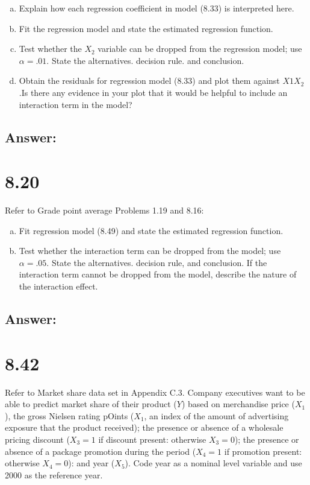 \documentclass{article}
\begin{document}
\begin{enumerate}[a)]
\item{} Explain how each regression coefficient in model (8.33) is interpreted here.
\item{} Fit the regression model and state the estimated regression function.
\item{} Test whether the $X_2$ variable can be dropped from the regression model; use $\alpha{} = .01$. State the alternatives. decision rule. and conclusion.
\item{} Obtain the residuals for regression model (8.33) and plot them against $X1X_2$.Is there any evidence in your plot that it would be helpful to include an interaction term in the model?
\end{enumerate}

\subsection{Answer:}

\section{8.20}

Refer to Grade point average Problems 1.19 and 8.16:

\begin{enumerate}[a)]
\item{} Fit regression model (8.49) and state the estimated regression function.
\item{} Test whether the interaction term can be dropped from the model; use $\alpha{} = .05$. State the alternatives. decision rule, and conclusion. If the interaction term cannot be dropped from the model, describe the nature of the interaction effect.
\end{enumerate}

\subsection{Answer:}

\section{8.42}

Refer to Market share data set in Appendix C.3. Company executives want to be able to predict market share of their product ($Y$) based on merchandise price ($X_1$), the gross Nielsen rating pOints ($X_1$, an index of the amount of advertising exposure that the product received); the presence or absence of a wholesale pricing discount ($X_3 = 1$ if discount present: otherwise $X_3 = 0$); the presence or absence of a package promotion during the period ($X_4 = 1$ if promotion present: otherwise $X_4 = 0$): and year ($X_5$). Code year as a nominal level variable and use 2000 as the reference year.
\end{document}
